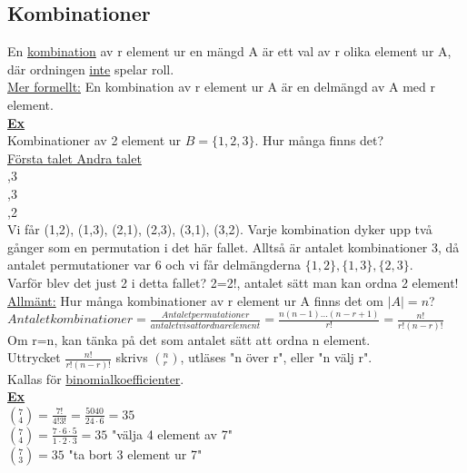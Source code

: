 \documentclass{article}
\begin{document}
        \subsection{Kombinationer}
            En \underline{kombination} av r element ur en mängd A är ett val av r olika element ur A, där ordningen \underline{inte} spelar roll.\\
            \underline{Mer formellt:} En kombination av r element ur A är en delmängd av A med r element.\\
            \underline{\textbf{Ex}}\\
            \indent Kombinationer av 2 element ur $B=\{1,2,3\}$. Hur många finns det?\\
            \indent \underline{Första talet Andra talet}\\
            \indent {} \indent \indent {},3\\
            \indent {} \indent \indent {},3\\
            \indent {} \indent \indent {},2\\
            Vi får (1,2), (1,3), (2,1), (2,3), (3,1), (3,2). Varje kombination dyker upp två gånger som en permutation i det här fallet. Alltså är antalet kombinationer 3, då antalet permutationer var 6 och vi får delmängderna $\{1,2\}, \{1,3\}, \{2,3\}$.\\
            Varför blev det just 2 i detta fallet? 2=2!, antalet sätt man kan ordna 2 element!\\
            \underline{Allmänt:} Hur många kombinationer av r element ur A finns det om $|A|=n$?\\
            $Antalet kombinationer=\frac{Antalet permutationer}{antalet vis att ordna r element}=\frac{n(n-1)...(n-r+1)}{r!}=\frac{n!}{r!(n-r)!}$\\
            Om r=n, kan tänka på det som antalet sätt att ordna n element.\\
            Uttrycket $\frac{n!}{r!(n-r)!}$ skrivs $(_{r}^{n})$, utläses "n över r", eller "n välj r".\\
            Kallas för \underline{binomialkoefficienter}.\\
            \underline{\textbf{Ex}}\\
            \indent $(_{4}^{7})=\frac{7!}{4!3!}=\frac{5040}{24\cdot 6} = 35$\\
            \indent $(_{4}^{7})=\frac{7\cdot 6\cdot 5}{1\cdot 2\cdot 3}=35$ "välja 4 element av 7"\\
            \indent $(_{3}^{7})=35$ "ta bort 3 element ur 7"
    \clearpage
\end{document}
